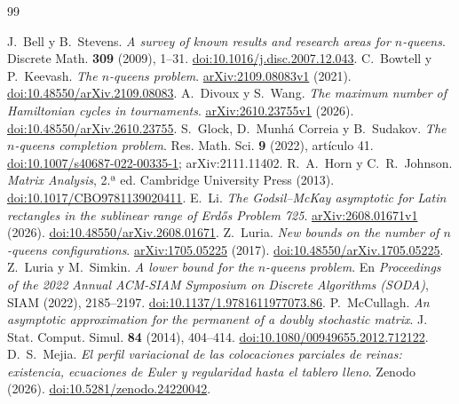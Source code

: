 \begin{thebibliography}{99}
\label{sec:bibliografia}
\raggedright
\setlength{\itemsep}{2pt}\setlength{\parsep}{0pt}
J.~Bell y B.~Stevens.
\emph{A survey of known results and research areas for $n$-queens}.
Discrete Math. \textbf{309} (2009), 1--31.
\href{https://doi.org/10.1016/j.disc.2007.12.043}{doi:10.1016/j.disc.2007.12.043}.
C.~Bowtell y P.~Keevash.
\emph{The $n$-queens problem}.
\href{https://arxiv.org/abs/2109.08083v1}{arXiv:2109.08083v1} (2021).
\href{https://doi.org/10.48550/arXiv.2109.08083}{doi:10.48550/arXiv.2109.08083}.
A.~Divoux y S.~Wang.
\emph{The maximum number of Hamiltonian cycles in tournaments}.
\href{https://arxiv.org/abs/2610.23755v1}{arXiv:2610.23755v1} (2026).
\href{https://doi.org/10.48550/arXiv.2610.23755}{doi:10.48550/arXiv.2610.23755}.
S.~Glock, D.~Munhá Correia y B.~Sudakov.
\emph{The $n$-queens completion problem}.
Res. Math. Sci. \textbf{9} (2022), artículo 41.
\href{https://doi.org/10.1007/s40687-022-00335-1}{doi:10.1007/s40687-022-00335-1}; arXiv:2111.11402.
R.~A.~Horn y C.~R.~Johnson.
\emph{Matrix Analysis}, 2.ª ed.
Cambridge University Press (2013).
\href{https://doi.org/10.1017/CBO9781139020411}{doi:10.1017/CBO9781139020411}.
E.~Li.
\emph{The Godsil--McKay asymptotic for Latin rectangles in the sublinear range of
Erd\H{o}s Problem 725}.
\href{https://arxiv.org/abs/2608.01671v1}{arXiv:2608.01671v1} (2026).
\href{https://doi.org/10.48550/arXiv.2608.01671}{doi:10.48550/arXiv.2608.01671}.
Z.~Luria.
\emph{New bounds on the number of $n$-queens configurations}.
\href{https://arxiv.org/abs/1705.05225}{arXiv:1705.05225} (2017).
\href{https://doi.org/10.48550/arXiv.1705.05225}{doi:10.48550/arXiv.1705.05225}.
Z.~Luria y M.~Simkin.
\emph{A lower bound for the $n$-queens problem}.
En \emph{Proceedings of the 2022 Annual ACM-SIAM Symposium on Discrete Algorithms (SODA)}, SIAM
(2022), 2185--2197.
\href{https://doi.org/10.1137/1.9781611977073.86}{doi:10.1137/1.9781611977073.86}.
P.~McCullagh.
\emph{An asymptotic approximation for the permanent of a doubly stochastic matrix}.
J. Stat. Comput. Simul. \textbf{84} (2014), 404--414.
\href{https://doi.org/10.1080/00949655.2012.712122}{doi:10.1080/00949655.2012.712122}.
D.~S.~Mejia.
\emph{El perfil variacional de las colocaciones parciales de reinas:
existencia, ecuaciones de Euler y regularidad hasta el tablero lleno}.
Zenodo (2026). \href{https://doi.org/10.5281/zenodo.24220042}{doi:10.5281/zenodo.24220042}.

\end{thebibliography}
